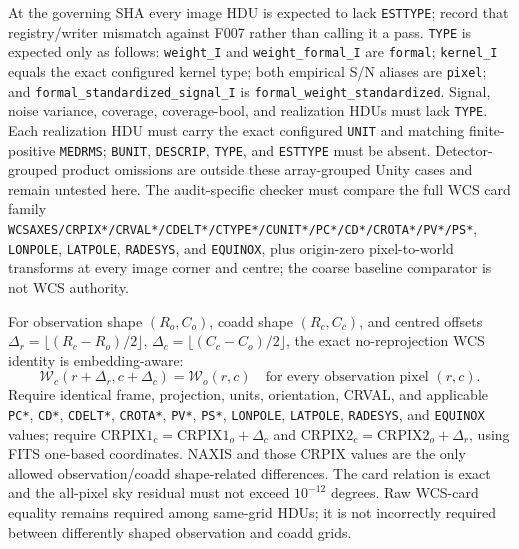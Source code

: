 \documentclass[11pt]{article}
\newcommand{\code}[1]{\nolinkurl{#1}}
\begin{document}
At the governing SHA every image HDU is expected to lack \code{ESTTYPE}; record
that registry/writer mismatch against F007 rather than calling it a pass.
\code{TYPE} is expected only as follows: \code{weight_I} and
\code{weight_formal_I} are \code{formal}; \code{kernel_I} equals the exact
configured kernel type; both empirical S/N aliases are \code{pixel}; and
\code{formal_standardized_signal_I} is
\code{formal_weight_standardized}.  Signal, noise variance, coverage,
coverage-bool, and realization HDUs must lack \code{TYPE}.  Each realization
HDU must carry the exact configured \code{UNIT} and matching finite-positive
\code{MEDRMS}; \code{BUNIT}, \code{DESCRIP}, \code{TYPE}, and \code{ESTTYPE}
must be absent.  Detector-grouped
product omissions are outside these array-grouped Unity cases and remain
untested here.  The
audit-specific checker must compare the full WCS card family
\code{WCSAXES/CRPIX*/CRVAL*/CDELT*/CTYPE*/CUNIT*/PC*/CD*/CROTA*/PV*/PS*},
\code{LONPOLE}, \code{LATPOLE}, \code{RADESYS}, and \code{EQUINOX}, plus
origin-zero pixel-to-world transforms at every image corner and centre; the
coarse baseline comparator is not WCS authority.

For observation shape \((R_o,C_o)\), coadd shape \((R_c,C_c)\), and centred
offsets \(\Delta_r=\lfloor(R_c-R_o)/2\rfloor\),
\(\Delta_c=\lfloor(C_c-C_o)/2\rfloor\), the exact no-reprojection WCS identity
is embedding-aware:
\[
  \mathcal W_c(r+\Delta_r,c+\Delta_c)=\mathcal W_o(r,c)
  \quad\text{for every observation pixel }(r,c).
\]
Require identical frame, projection, units, orientation, CRVAL, and applicable
\code{PC*}, \code{CD*}, \code{CDELT*}, \code{CROTA*}, \code{PV*},
\code{PS*}, \code{LONPOLE}, \code{LATPOLE}, \code{RADESYS}, and
\code{EQUINOX} values; require
\(\mathrm{CRPIX1}_c=\mathrm{CRPIX1}_o+\Delta_c\) and
\(\mathrm{CRPIX2}_c=\mathrm{CRPIX2}_o+\Delta_r\), using FITS one-based
coordinates.  NAXIS and those CRPIX values are the only allowed
observation/coadd shape-related differences.  The card relation is exact and
the all-pixel sky residual must not exceed \(10^{-12}\) degrees.  Raw WCS-card
equality remains required among same-grid HDUs; it is not incorrectly required
between differently shaped observation and coadd grids.
\end{document}
